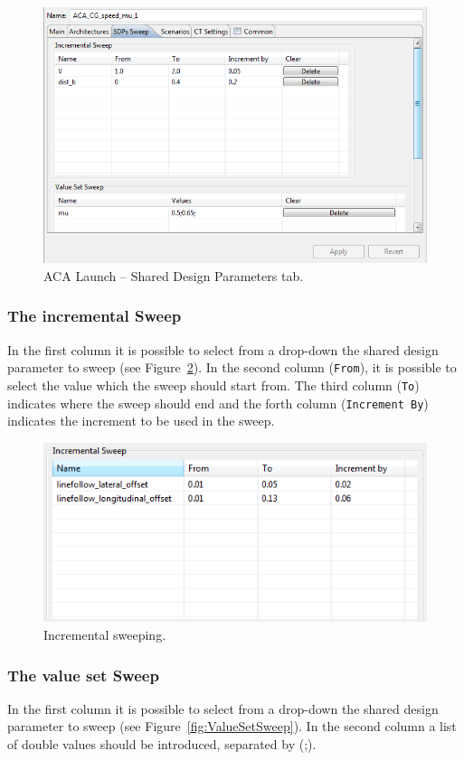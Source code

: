 \documentclass{crescendorepchap}
\begin{document}
\begin{figure}[htbp]
\centering
\includegraphics[width=.6\textwidth]{images/SDPsSweep.png}
\caption{ACA Launch -- Shared Design Parameters tab.\label{fig:SDPsSweep}}
\end{figure}

\subsubsection{The incremental Sweep}

In the first column it is possible to select from a drop-down the shared
design parameter to sweep (see Figure~\ref{fig:IncrementalSweep}). 
In the second column (\texttt{From}), it is possible
to select the value which the sweep should start from. The third column
(\texttt{To}) indicates where the sweep should end and the forth column
(\texttt{Increment By}) indicates the increment to be used in the sweep.

\begin{figure}[htbp]
\centering
\includegraphics[width=.6\textwidth]{images/IncrementalSweep.png}
\caption{Incremental sweeping.\label{fig:IncrementalSweep}}
\end{figure}

\subsubsection{The value set Sweep}

In the first column it is possible to select from a drop-down the shared
design parameter to sweep (see Figure~\ref{fig:ValueSetSweep}). 
In the second column a list of double values
should be introduced, separated by (;).
\end{document}
